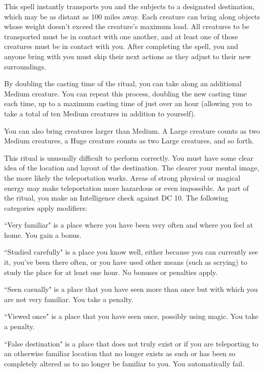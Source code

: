 \begin{spelleffect}
This spell instantly transports you and the subjects to a designated destination, which may be as distant as 100 miles away. Each creature can bring along objects whose weight doesn't exceed the creature's maximum load. All creatures to be transported must be in contact with one another, and at least one of those creatures must be in contact with you. After completing the spell, you and anyone bring with you must skip their next actions as they adjust to their new surroundings.
\par By doubling the casting time of the ritual, you can take along an additional Medium creature. You can repeat this process, doubling the new casting time each time, up to a maximum casting time of just over an hour (allowing you to take a total of ten Medium creatures in addition to yourself).
\par You can also bring creatures larger than Medium. A Large creature counts as two Medium creatures, a Huge creature counts as two Large creatures, and so forth.
\par This ritual is unusually difficult to perform correctly. You must have some clear idea of the location and layout of the destination. The clearer your mental image, the more likely the teleportation works. Areas of strong physical or magical energy may make teleportation more hazardous or even impossible. As part of the ritual, you make an Intelligence check against DC 10. The following categories apply modifiers:
\begin{itemize*}
\item ``Very familiar" is a place where you have been very often and where you feel at home. You gain a  bonus.
\item ``Studied carefully" is a place you know well, either because you can currently see it, you've been there often, or you have used other means (such as scrying) to study the place for at least one hour. No bonuses or penalties apply.
\item ``Seen casually" is a place that you have seen more than once but with which you are not very familiar. You take a  penalty.
\item ``Viewed once" is a place that you have seen once, possibly using magic. You take a  penalty.
\item ``False destination" is a place that does not truly exist or if you are teleporting to an otherwise familiar location that no longer exists as such or has been so completely altered as to no longer be familiar to you. You automatically fail.
\end{itemize*}


\end{spelleffect}
